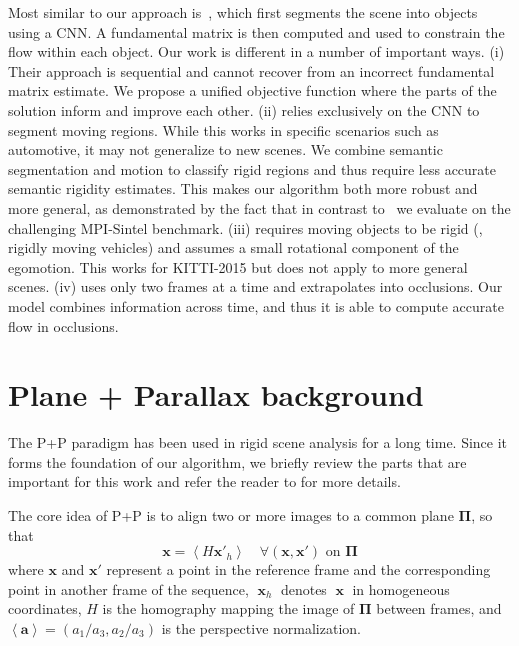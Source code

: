 \documentclass[10pt,twocolumn,letterpaper]{article}
\DeclareMathOperator{\x}{\mathbf{x}}
\begin{document}
Most similar to our approach is~\cite{Bai:2016:SemanticDeepFlow}, which first segments the scene into objects using a CNN.
A fundamental matrix is then computed and used to constrain the flow within each object.
Our work is different in a number of important ways.
(i) Their approach is sequential and cannot recover from an incorrect fundamental matrix estimate.
We propose a unified objective function where the parts of the solution inform and improve each other.
(ii) \cite{Bai:2016:SemanticDeepFlow} relies exclusively on the CNN to segment moving regions.
While this works in specific scenarios such as automotive, it may not
generalize to new scenes. 
We combine semantic segmentation and motion to classify
rigid regions and thus require less accurate semantic rigidity estimates.
This makes our algorithm both more robust and more general, as demonstrated by the fact that in contrast to~\cite{Bai:2016:SemanticDeepFlow} we evaluate on the challenging MPI-Sintel benchmark.
(iii) \cite{Bai:2016:SemanticDeepFlow} requires moving objects to be
rigid (\ie, rigidly moving vehicles) and assumes a small rotational
component of the egomotion.  
This works for KITTI-2015 but does not apply to more general scenes.
(iv) \cite{Bai:2016:SemanticDeepFlow} uses only two frames at a time and extrapolates into occlusions.
Our model combines information across time, and thus it is able to compute accurate flow in occlusions.
















 \section{Plane + Parallax background}
\noindent
The P+P paradigm has been used in rigid scene analysis for a long time.
Since it forms the foundation of our algorithm, we briefly review the parts that are important for this work and refer the reader to \cite{Irani:1998:ReferenceFrames,Sawhney:1994:3DGeometryPPP} for more details.

The core idea of P+P is to align two or more images to a common plane $\mathbf{\Pi}$, so that
\begin{equation}
\mathbf{x} = \left\langle H \mathbf{x'}_h \right\rangle \quad \forall (\mathbf{x},\mathbf{x'})
\text{ on }
\mathbf{\Pi}
\end{equation}
where $\mathbf{x}$ and $\mathbf{x'}$ represent a point in the reference frame and the corresponding point in another frame of the sequence, $\x_h$ denotes $\x$ in homogeneous coordinates, $H$ is the homography mapping the image of $\mathbf{\Pi}$ between frames, and $\left\langle \mathbf{a} \right\rangle = \left( a_1 / a_3, a_2 / a_3 \right)$ is the perspective normalization.
\end{document}
